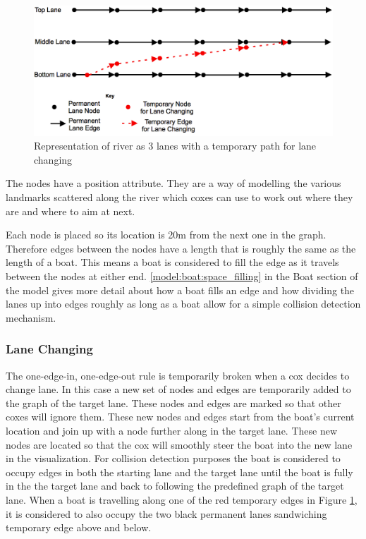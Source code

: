       \begin{figure}
      \begin{center}
      	\includegraphics[scale=0.55,angle=90]{images/lanes.png}
      	\caption{Representation of river as 3 lanes with a temporary path for lane changing}
      	\label{fig:model:lanes}
      \end{center}
      \end{figure}
      
      The nodes have a position attribute. They are a way of modelling the various landmarks scattered along the river which coxes can use to work out where they are and where to aim at next.
      
      Each node is placed so its location is 20m from the next one in the graph. Therefore edges between the nodes have a length that is roughly the same as the length of a boat. This means a boat is considered to fill the edge as it travels between the nodes at either end. \ref{model:boat:space_filling} in the Boat section of the model  gives more detail about how a boat fills an edge and how dividing the lanes up into edges roughly as long as a boat allow for a simple collision detection mechanism.
      
      \subsubsection{Lane Changing} \label{model:river:lane_changing}
      The one-edge-in, one-edge-out rule is temporarily broken when a cox decides to change lane. In this case a new set of nodes and edges are temporarily added to the graph of the target lane. These nodes and edges are marked so that other coxes will ignore them. These new nodes and edges start from the boat's current location and join up with a node further along in the target lane. These new nodes are located so that the cox will smoothly steer the boat into the new lane in the visualization. For collision detection purposes the boat is considered to occupy edges in both the starting lane and the target lane until the boat is fully in the the target lane and back to following the predefined graph of the target lane. When a boat is travelling along one of the red temporary edges in Figure \ref{fig:model:lanes}, it is considered to also occupy the two black permanent lanes sandwiching temporary edge above and below.

